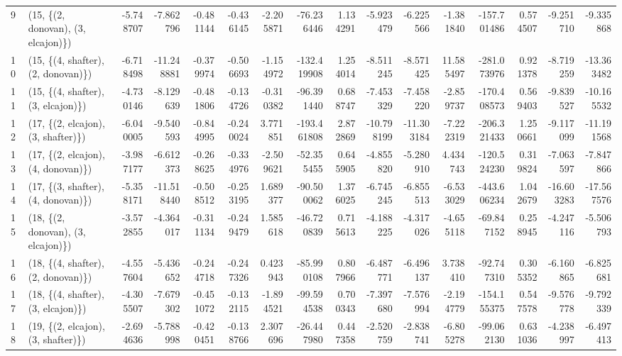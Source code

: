 \begin{tabular}{llrrrrrrrrrrrrrr}
9  &  (15, \{(2, donovan), (3, elcajon)\}) &  -5.748707 &  -7.862796 &  -0.481144 & -0.436145 &  -2.205871 &   -76.236446 &   1.134291 &  -5.923479 &  -6.225566 &  -1.381840 & -157.701486 &  0.574507 &  -9.251710 &  -9.335868 \\
10 &  (15, \{(4, shafter), (2, donovan)\}) &  -6.718498 & -11.248881 &  -0.379974 & -0.506693 &  -1.154972 &  -132.419908 &   1.254014 &  -8.511245 &  -8.571425 &  11.585497 & -281.073976 &  0.921378 &  -8.719259 & -13.363482 \\
11 &  (15, \{(4, shafter), (3, elcajon)\}) &  -4.730146 &  -8.129639 &  -0.481806 & -0.134726 &  -0.310382 &   -96.391440 &   0.688747 &  -7.453329 &  -7.458220 &  -2.859737 & -170.408573 &  0.569403 &  -9.839527 & -10.165532 \\
12 &  (17, \{(2, elcajon), (3, shafter)\}) &  -6.040005 &  -9.540593 &  -0.844995 & -0.240024 &   3.771851 &  -193.461808 &   2.872869 & -10.798199 & -11.303184 &  -7.222319 & -206.321433 &  1.250661 &  -9.117099 & -11.191568 \\
13 &  (17, \{(2, elcajon), (4, donovan)\}) &  -3.987177 &  -6.612373 &  -0.268625 & -0.334976 &  -2.509621 &   -52.355455 &   0.645905 &  -4.855820 &  -5.280910 &   4.434743 & -120.524230 &  0.319824 &  -7.063597 &  -7.847866 \\
14 &  (17, \{(3, shafter), (4, donovan)\}) &  -5.358171 & -11.518440 &  -0.508512 & -0.253195 &   1.689377 &   -90.500062 &   1.376025 &  -6.745245 &  -6.855513 &  -6.533029 & -443.606234 &  1.042679 & -16.603283 & -17.567576 \\
15 &  (18, \{(2, donovan), (3, elcajon)\}) &  -3.572855 &  -4.364017 &  -0.311134 & -0.249479 &   1.585618 &   -46.720839 &   0.715613 &  -4.188225 &  -4.317026 &  -4.655118 &  -69.847152 &  0.258945 &  -4.247116 &  -5.506793 \\
16 &  (18, \{(4, shafter), (2, donovan)\}) &  -4.557604 &  -5.436652 &  -0.244718 & -0.247326 &   0.423943 &   -85.990108 &   0.807966 &  -6.487771 &  -6.496137 &   3.738410 &  -92.747310 &  0.305352 &  -6.160865 &  -6.825681 \\
17 &  (18, \{(4, shafter), (3, elcajon)\}) &  -4.305507 &  -7.679302 &  -0.451072 & -0.132115 &  -1.894521 &   -99.594538 &   0.700343 &  -7.397680 &  -7.576994 &  -2.194779 & -154.155375 &  0.547578 &  -9.576778 &  -9.792339 \\
18 &  (19, \{(2, elcajon), (3, shafter)\}) &  -2.694636 &  -5.788998 &  -0.420451 & -0.138766 &   2.307696 &   -26.447980 &   0.447358 &  -2.520759 &  -2.838741 &  -6.805278 &  -99.062130 &  0.631036 &  -4.238997 &  -6.497413 \\

\end{tabular}
